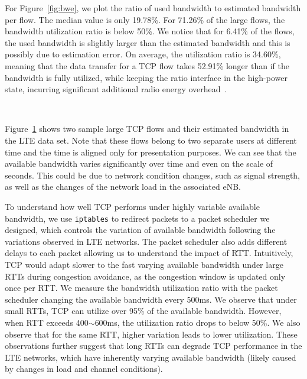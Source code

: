 For Figure~\ref{fig:bwe}, we plot the ratio of used bandwidth to estimated bandwidth per flow. The median value is only 19.78\%. For 71.26\% of the large flows, the bandwidth utilization ratio is below 50\%. We notice that for 6.41\% of the flows, the used bandwidth is slightly larger than the estimated bandwidth and this is possibly due to estimation error. On average, the utilization ratio is 34.60\%, meaning that the data transfer for a TCP flow takes 52.91\% longer than if the bandwidth is fully utilized, while keeping the ratio interface in the high-power state, incurring significant additional radio energy overhead~\cite{huang_mobisys12}.


\begin{figure}[t]
\centering
{}\\
\label{fig:bwe.sample}
\end{figure}

Figure~\ref{fig:bwe.sample} shows two sample large TCP flows and their estimated bandwidth in the LTE data set. Note that these flows belong to two separate users at different time and the time is aligned only for presentation purposes. We can see that the available bandwidth varies significantly over time and even on the scale of seconds. This could be due to network condition changes, such as signal strength, as well as the changes of the network load in the associated eNB.

To understand how well TCP performs under highly variable available bandwidth, we use \texttt{iptables} to redirect packets to a packet scheduler we designed, which controls the variation of available bandwidth following the variations observed in LTE networks. The packet scheduler also adds different delays to each packet allowing us to understand the impact of RTT. Intuitively, TCP would adapt slower to the fast varying available bandwidth under large RTTs during congestion avoidance, as the congestion window is updated only once per RTT. We measure the bandwidth utilization ratio with the packet scheduler changing the available bandwidth every 500ms. We observe that under small RTTs, TCP can utilize over 95\% of the available bandwidth. However, when RTT exceeds 400$\sim$600ms, the utilization ratio drops to below 50\%. We also observe that for the same RTT, higher variation leads to lower utilization. These observations further suggest that long RTTs can degrade TCP performance in the LTE networks, which have inherently varying available bandwidth (likely caused by changes in load and channel conditions).





